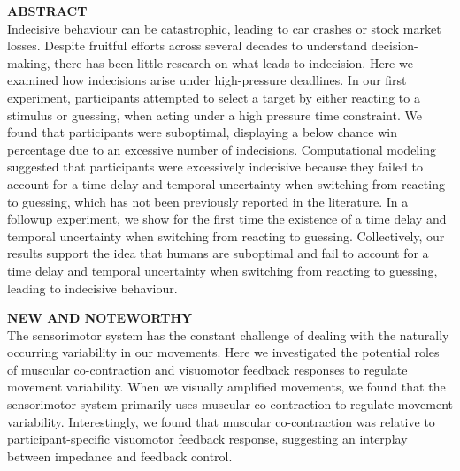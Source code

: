 \documentclass[12pt,letterpaper]{article}
\begin{document}
\newpage
\doublespace %
\linenumbers %
\noindent \textbf{\large\textcolor{mydarkblue}{ABSTRACT}}
\vspace{2mm}
\\
Indecisive behaviour can be catastrophic, leading to car crashes or stock market losses. Despite fruitful efforts across several decades to understand decision-making, there has been little research on what leads to indecision. Here we examined how indecisions arise under high-pressure deadlines. In our first experiment, participants attempted to select a target by either reacting to a stimulus or guessing, when acting under a high pressure time constraint. We found that participants were suboptimal, displaying a below chance win percentage due to an excessive number of indecisions. Computational modeling suggested that participants were excessively indecisive because they failed to account for a time delay and temporal uncertainty when switching from reacting to guessing, which has not been previously reported in the literature. In a followup experiment, we show for the first time the existence of a time delay and temporal uncertainty when switching from reacting to guessing. Collectively, our results support the idea that humans are suboptimal and fail to account for a time delay and temporal uncertainty when switching from reacting to guessing, leading to indecisive behaviour.
\newpage

\noindent \textbf{\large\textcolor{mydarkblue}{NEW AND NOTEWORTHY}}
\vspace{2mm}
\\
The sensorimotor system has the constant challenge of dealing with the naturally occurring variability in our movements. Here we investigated the potential roles of muscular co-contraction and visuomotor feedback responses to regulate movement variability. When we visually amplified movements, we found that the sensorimotor system primarily uses muscular co-contraction to regulate movement variability. Interestingly, we found that muscular co-contraction was relative to participant-specific visuomotor feedback response, suggesting an interplay between impedance and feedback control.
\newpage
%
\pagestyle{fancy}
\fancyhead[R]{\emph{\textcolor{mydarkblue}{Indecision arises from suboptimal switching behaviour
        }}}
\fancyfoot[C]{\textcolor{mydarkblue}{\thepage}}
\end{document}
